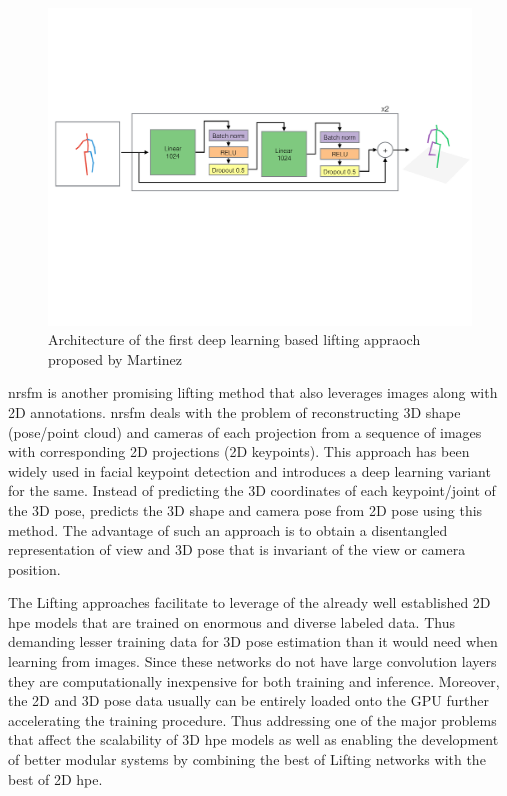 \begin{figure}[h]
    \centering
    \includegraphics[width=\linewidth]{figures/background/lifting_arch.pdf}
    \caption{Architecture of the first deep learning based lifting appraoch proposed by Martinez \etal \cite{MartinezHRL17}}
    \label{fig:lifting_arch}
\end{figure}

\ac{nrsfm} is another promising lifting method that also leverages images along with 2D annotations. \ac{nrsfm} deals with the problem of reconstructing 3D shape (pose/point cloud) and cameras of each projection from a sequence of images with corresponding 2D projections (2D keypoints). This approach has been widely used in facial keypoint detection and \cite{deepNRSFM} introduces a deep learning variant for the same. Instead of predicting the 3D coordinates of each keypoint/joint of the 3D pose, \cite{DistillNRSfM, c3dpo, deepNRSFM, nrsfm++} predicts the 3D shape and camera pose from 2D pose using this method. The advantage of such an approach is to obtain a disentangled representation of view and 3D pose that is invariant of the view or camera position.

The Lifting approaches facilitate to leverage of the already well established 2D \ac{hpe} models that are trained on enormous and diverse labeled data. Thus demanding lesser training data for 3D pose estimation than it would need when learning from images. Since these networks do not have large convolution layers they are computationally inexpensive for both training and inference. Moreover, the 2D and 3D pose data usually can be entirely loaded onto the GPU further accelerating the training procedure. Thus addressing one of the major problems that affect the scalability of 3D \ac{hpe} models as well as enabling the development of better modular systems by combining the best of Lifting networks with the best of 2D \ac{hpe}.

